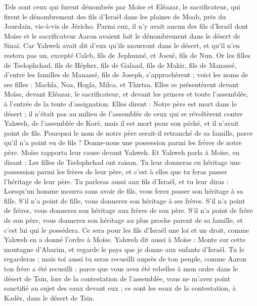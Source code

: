 \begin{multicols}{2}
Tels sont ceux qui furent dénombrés par Moïse et Eléazar, le sacrificateur, qui firent le dénombrement des fils d'Israël dans les plaines de Moab, près du Jourdain, vis-à-vis de Jéricho.
Parmi eux, il n’y avait aucun des fils d’Israël dont Moïse et le sacrificateur Aaron avaient fait le dénombrement dans le désert de Sinaï.
Car Yahweh avait dit d'eux qu’ils mourront dans le désert, et qu’il n'en restera pas un, excepté Caleb, fils de Jephunné, et Josué, fils de Nun.
\VerseOne{}Or les filles de Tselophchad, fils de Hépher, fils de Galaad, fils de Makir, fils de Manassé, d'entre les familles de Manassé, fils de Joseph, s'approchèrent ; voici les noms de ses filles : Machla, Noa, Hogla, Milca, et Thirtsa.
Elles se présentèrent devant Moïse, devant Eléazar, le sacrificateur, et devant les princes et toute l'assemblée, à l'entrée de la tente d'assignation. Elles dirent :
Notre père est mort dans le désert ; il n’était pas au milieu de l’assemblée de ceux qui se révoltèrent contre Yahweh, de l'assemblée de Koré, mais il est mort pour son péché, et il n'avait point de fils.
Pourquoi le nom de notre père serait-il retranché de sa famille, parce qu'il n'a point eu de fils ? Donne-nous une possession parmi les frères de notre père.
Moïse rapporta leur cause devant Yahweh.
Et Yahweh parla à Moïse, en disant :
Les filles de Tselophchad ont raison. Tu leur donneras en héritage une possession parmi les frères de leur père, et c’est à elles que tu feras passer l'héritage de leur père.
Tu parleras aussi aux fils d'Israël, et tu leur diras : Lorsqu’un homme mourra sans avoir de fils, vous ferez passer son héritage à sa fille.
S'il n'a point de fille, vous donnerez son héritage à ses frères.
S'il n'a point de frères, vous donnerez son héritage aux frères de son père.
S’il n’a point de frère de son père, vous donnerez son héritage au plus proche parent de sa famille, et c’est lui qui le possédera. Ce sera pour les fils d'Israël une loi et un droit, comme Yahweh en a donné l’ordre à Moïse.
Yahweh dit aussi à Moïse : Monte sur cette montagne d'Abarim, et regarde le pays que je donne aux enfants d'Israël.
Tu le regarderas ; mais toi aussi tu seras recueilli auprès de ton peuple, comme Aaron ton frère a été recueilli ;
parce que vous avez été rebelles à mon ordre dans le désert de Tsin, lors de la contestation de l'assemblée, vous ne m'avez point sanctifié au sujet des eaux devant eux ; ce sont les eaux de la contestation, à Kadès, dans le désert de Tsin.

\end{multicols}
